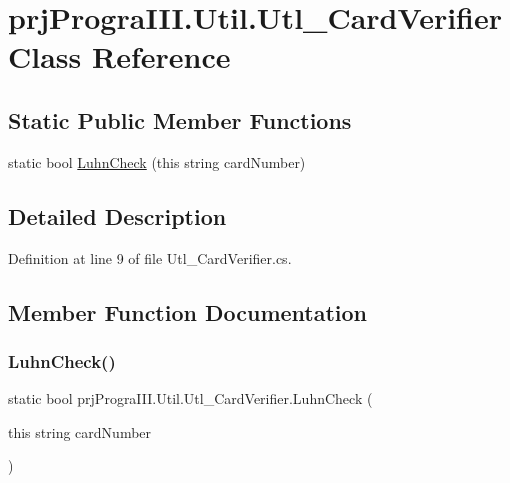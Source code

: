 \hypertarget{classprj_progra_i_i_i_1_1_util_1_1_utl___card_verifier}{}\section{prj\+Progra\+I\+I\+I.\+Util.\+Utl\+\_\+\+Card\+Verifier Class Reference}
\label{classprj_progra_i_i_i_1_1_util_1_1_utl___card_verifier}
\subsection*{Static Public Member Functions}
\begin{DoxyCompactItemize}
\item 
static bool \hyperlink{classprj_progra_i_i_i_1_1_util_1_1_utl___card_verifier_ad387c83560ed0b90ab57ce4e529d3e12}{Luhn\+Check} (this string card\+Number)
\end{DoxyCompactItemize}


\subsection{Detailed Description}


Definition at line 9 of file Utl\+\_\+\+Card\+Verifier.\+cs.



\subsection{Member Function Documentation}
\hypertarget{classprj_progra_i_i_i_1_1_util_1_1_utl___card_verifier_ad387c83560ed0b90ab57ce4e529d3e12}{}\label{classprj_progra_i_i_i_1_1_util_1_1_utl___card_verifier_ad387c83560ed0b90ab57ce4e529d3e12} 
\subsubsection{\texorpdfstring{Luhn\+Check()}{LuhnCheck()}}
{\footnotesize\ttfamily static bool prj\+Progra\+I\+I\+I.\+Util.\+Utl\+\_\+\+Card\+Verifier.\+Luhn\+Check (\begin{DoxyParamCaption}\item[{this string}]{card\+Number }\end{DoxyParamCaption})\hspace{0.3cm}{\ttfamily [static]}}



